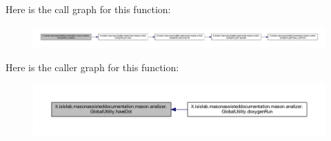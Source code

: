 Here is the call graph for this function\-:
\nopagebreak
\begin{figure}[H]
\begin{center}
\leavevmode
\includegraphics[width=350pt]{classit_1_1isislab_1_1masonassisteddocumentation_1_1mason_1_1analizer_1_1_global_utility_a396066731dbc923fe85d28988511ba46_cgraph}
\end{center}
\end{figure}




Here is the caller graph for this function\-:
\nopagebreak
\begin{figure}[H]
\begin{center}
\leavevmode
\includegraphics[width=350pt]{classit_1_1isislab_1_1masonassisteddocumentation_1_1mason_1_1analizer_1_1_global_utility_a396066731dbc923fe85d28988511ba46_icgraph}
\end{center}
\end{figure}


